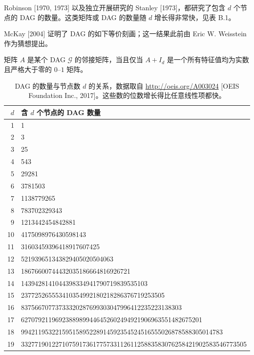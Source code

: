 Robinson [1970, 1973] 以及独立开展研究的 Stanley [1973]，都研究了包含 $d$ 个节点的 DAG 的数量。这类矩阵或 DAG 的数量随 $d$ 增长得非常快，见表 B.1。

McKay [2004] 证明了 DAG 的如下等价刻画；这一结果此前由 Eric W. Weisstein 作为猜想提出。
\begin{theorem}
矩阵 $A$ 是某个 DAG $\mathcal G$ 的邻接矩阵，当且仅当 $A+I_d$ 是一个所有特征值均为实数且严格大于零的 $0$--$1$ 矩阵。
\end{theorem}

\begin{table}[!htbp]
\centering
\small
\begin{tabular}{r l}
\toprule
$d$ & 含 $d$ 个节点的 DAG 数量 \\
\midrule
1 & 1 \\
2 & 3 \\
3 & 25 \\
4 & 543 \\
5 & 29281 \\
6 & 3781503 \\
7 & 1138779265 \\
8 & 783702329343 \\
9 & 1213442454842881 \\
10 & 4175098976430598143 \\
11 & 31603459396418917607425 \\
12 & 521939651343829405020504063 \\
13 & 18676600744432035186664816926721 \\
14 & 1439428141044398334941790719839535103 \\
15 & 237725265553410354992180218286376719253505 \\
16 & 83756670773733320287699303047996412235223138303 \\
17 & 62707921196923889899446452602494921906963551482675201 \\
18 & 99421195322159515895228914592354524516555026878588305014783 \\
19 & 332771901227107591736177573311261125883583076258421902583546773505 \\
\bottomrule
\end{tabular}
\caption{DAG 的数量与节点数 $d$ 的关系，数据取自 \url{http://oeis.org/A003024} [OEIS Foundation Inc., 2017]。这些数的位数增长得比任意线性项都快。}
\end{table}
